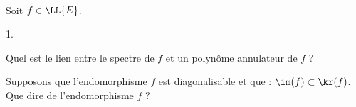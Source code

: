 \documentclass[11pt]{article}%
\begin{document}
\begin{exerciceSP}~\\
  Soit $f \in \LL{E}$.
  \begin{noliste}{1.}
  \item Quel est le lien entre le spectre de $f$ et un polynôme
    annulateur de $f$ ?
    
  \item Supposons que l'endomorphisme $f$ est diagonalisable et
    que : $\im(f) \subset \kr(f)$.\\
    Que dire de l'endomorphisme $f$ ?
  \end{noliste}
\end{exerciceSP}




\end{document}
